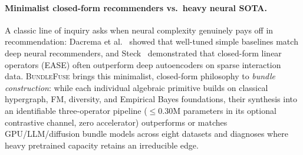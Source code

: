 \paragraph{Minimalist closed-form recommenders vs.\ heavy neural SOTA.}
A classic line of inquiry asks when neural complexity genuinely pays off in recommendation: Dacrema et
al.~\cite{dacrema} showed that well-tuned simple baselines match deep neural recommenders, and Steck~\cite{steck2019}
demonstrated that closed-form linear operators (EASE) often outperform deep autoencoders on sparse interaction
data. \textsc{BundleFuse} brings this minimalist, closed-form philosophy to \emph{bundle construction}: while each
individual algebraic primitive builds on classical hypergraph, FM, diversity, and Empirical Bayes foundations,
their synthesis into an identifiable three-operator pipeline ($\le 0.30$M parameters in its optional contrastive
channel, zero accelerator) outperforms or matches GPU/LLM/diffusion bundle models across eight datasets and
diagnoses where heavy pretrained capacity retains an irreducible edge.
